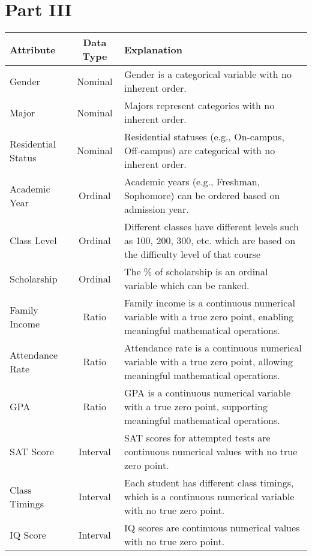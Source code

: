\documentclass{article}
\begin{document}
\section*{Part III}
\begin{tabular}{|p{4cm}|c|p{7cm}|}
    \hline
    \textbf{Attribute} & \textbf{Data Type} & \textbf{Explanation}                                                                                                       \\
    \hline
    Gender             & Nominal            & Gender is a categorical variable with no inherent order.                                                                   \\
    \hline
    Major              & Nominal            & Majors represent categories with no inherent order.                                                                        \\
    \hline
    Residential Status & Nominal            & Residential statuses (e.g., On-campus, Off-campus) are categorical with no inherent order.                                 \\
    \hline
    Academic Year      & Ordinal            & Academic years (e.g., Freshman, Sophomore) can be ordered based on admission year.                                         \\
    \hline
    Class Level        & Ordinal            & Different classes have different levels such as 100, 200, 300, etc. which are based on the difficulty level of that course \\
    \hline
    Scholarship        & Ordinal            & The \% of scholarship is an ordinal variable which can be ranked.                                                          \\
    \hline
    Family Income      & Ratio              & Family income is a continuous numerical variable with a true zero point, enabling meaningful mathematical operations.      \\
    \hline
    Attendance Rate    & Ratio              & Attendance rate is a continuous numerical variable with a true zero point, allowing meaningful mathematical operations.    \\
    \hline
    GPA                & Ratio              & GPA is a continuous numerical variable with a true zero point, supporting meaningful mathematical operations.              \\
    \hline
    SAT Score          & Interval           & SAT scores for attempted tests are continuous numerical values with no true zero point.                                    \\
    \hline
    Class Timings      & Interval           & Each student has different class timings, which is a continuous numerical variable with no true zero point.                \\
    \hline
    IQ Score           & Interval           & IQ scores are continuous numerical values with no true zero point.                                                         \\
    \hline
\end{tabular}
\end{document}

